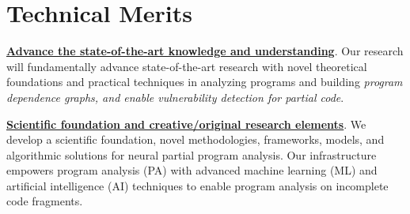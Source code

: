 \section{Technical Merits}

\noindent \underline{{\bf Advance the state-of-the-art knowledge and understanding}}. Our research will fundamentally advance state-of-the-art research with novel theoretical foundations and practical techniques in analyzing programs and building {\em program dependence graphs, and enable vulnerability detection for partial code}.

\noindent \underline{{\bf Scientific foundation and creative/original research elements}}. We develop a scientific foundation, novel methodologies, frameworks, models, and algorithmic solutions for neural partial program analysis. Our infrastructure empowers program analysis (PA) with advanced machine learning (ML) and artificial intelligence (AI) techniques to enable program analysis on incomplete code fragments.
